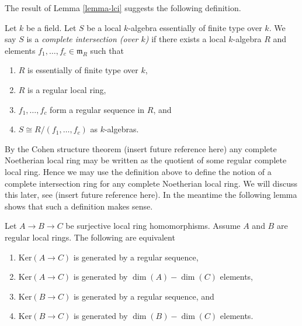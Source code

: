 \noindent
The result of Lemma \ref{lemma-lci} suggests the following definition.

\begin{definition}
\label{definition-lci-local-ring}
Let $k$ be a field. Let $S$ be a local $k$-algebra essentially of finite type
over $k$. We say $S$ is a {\it complete intersection (over $k$)}
if there exists a local $k$-algebra $R$ and elements
$f_1, \ldots, f_c \in \mathfrak m_R$ such that
\begin{enumerate}
\item $R$ is essentially of finite type over $k$,
\item $R$ is a regular local ring,
\item $f_1, \ldots, f_c$ form a regular sequence in $R$, and
\item $S \cong R/(f_1, \ldots, f_c)$ as $k$-algebras.
\end{enumerate}
\end{definition}

\noindent
By the Cohen structure theorem (insert future reference here) any complete
Noetherian local ring may be written as the quotient of some regular complete
local ring. Hence we may use the definition above to define the notion of
a complete intersection ring for any complete Noetherian local ring.
We will discuss this later, see (insert future reference here). In the meantime
the following lemma shows that such a definition makes sense.

\begin{lemma}
\label{lemma-ci-well-defined}
Let $A \to B \to C$ be surjective local ring homomorphisms.
Assume $A$ and $B$ are regular local rings. The following are equivalent
\begin{enumerate}
\item $\text{Ker}(A \to C)$ is generated by a regular sequence,
\item $\text{Ker}(A \to C)$ is generated by $\dim(A) - \dim(C)$ elements,
\item $\text{Ker}(B \to C)$ is generated by a regular sequence, and
\item $\text{Ker}(B \to C)$ is generated by $\dim(B) - \dim(C)$ elements.
\end{enumerate}
\end{lemma}

